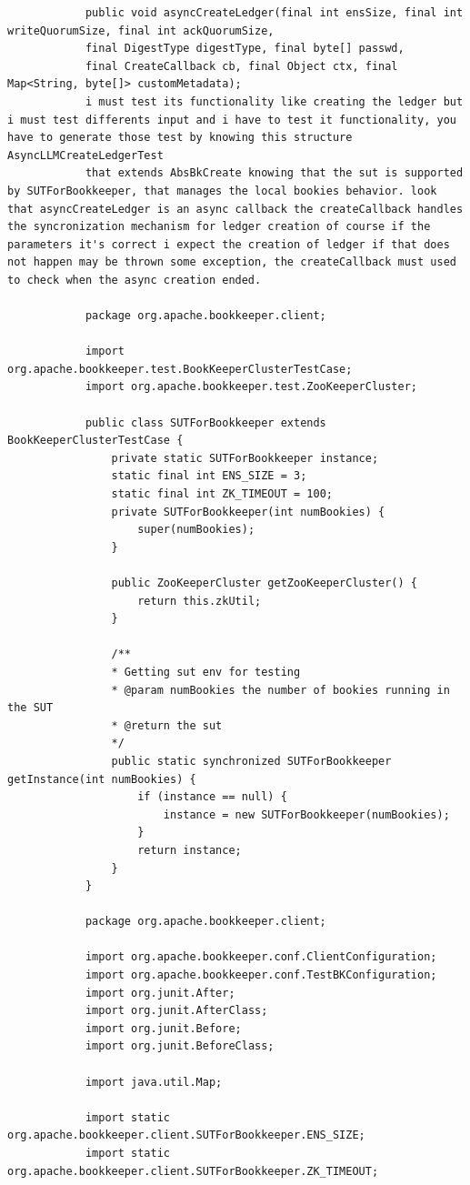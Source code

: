 \documentclass[10pt]{article}
\begin{document}
{\begin{verbatim}
			public void asyncCreateLedger(final int ensSize, final int writeQuorumSize, final int ackQuorumSize,
			final DigestType digestType, final byte[] passwd,
			final CreateCallback cb, final Object ctx, final Map<String, byte[]> customMetadata);
			i must test its functionality like creating the ledger but i must test differents input and i have to test it functionality, you have to generate those test by knowing this structure AsyncLLMCreateLedgerTest
			that extends AbsBkCreate knowing that the sut is supported by SUTForBookkeeper, that manages the local bookies behavior. look that asyncCreateLedger is an async callback the createCallback handles the syncronization mechanism for ledger creation of course if the parameters it's correct i expect the creation of ledger if that does not happen may be thrown some exception, the createCallback must used to check when the async creation ended. 
			
			package org.apache.bookkeeper.client;
			
			import org.apache.bookkeeper.test.BookKeeperClusterTestCase;
			import org.apache.bookkeeper.test.ZooKeeperCluster;
			
			public class SUTForBookkeeper extends BookKeeperClusterTestCase {
				private static SUTForBookkeeper instance;
				static final int ENS_SIZE = 3;
				static final int ZK_TIMEOUT = 100;
				private SUTForBookkeeper(int numBookies) {
					super(numBookies);
				}
				
				public ZooKeeperCluster getZooKeeperCluster() {
					return this.zkUtil;
				}
				
				/**
				* Getting sut env for testing
				* @param numBookies the number of bookies running in the SUT
				* @return the sut
				*/
				public static synchronized SUTForBookkeeper getInstance(int numBookies) {
					if (instance == null) {
						instance = new SUTForBookkeeper(numBookies);
					}
					return instance;
				}
			}
			
			package org.apache.bookkeeper.client;
			
			import org.apache.bookkeeper.conf.ClientConfiguration;
			import org.apache.bookkeeper.conf.TestBKConfiguration;
			import org.junit.After;
			import org.junit.AfterClass;
			import org.junit.Before;
			import org.junit.BeforeClass;
			
			import java.util.Map;
			
			import static org.apache.bookkeeper.client.SUTForBookkeeper.ENS_SIZE;
			import static org.apache.bookkeeper.client.SUTForBookkeeper.ZK_TIMEOUT;
			

\end{verbatim}}
\end{document}
